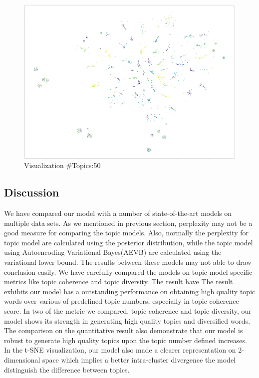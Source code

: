\begin{figure}
\centering
\includegraphics[width=1\linewidth]{figures/0908/tsne_50t_25w_0}
\caption{Visualization \#Topics:50}
\label{fig:tsne50t25w0}
\end{figure}
\subsection{Discussion}
We have compared our model with a number of state-of-the-art models on multiple data sets. 
As we mentioned in previous section, perplexity may not be a good measure for comparing the topic models. Also, normally the perplexity for topic model are calculated using the posterior distribution, while the topic model using Autoencoding Variational Bayes(AEVB) are calculated using the variational lower bound\cite{srivastava_autoencoding_2017}. The results between these models may not able to draw conclusion easily. We have carefully compared the models on topic-model specific metrics like topic coherence and topic diversity. The result have
The result exhibits our model has a outstanding performance on obtaining high quality topic words over various of predefined topic numbers, especially in topic coherence score. In two of the metric we compared, topic coherence and topic diversity, our model shows its strength in generating high quality topics and diversified words. The comparison on the quantitative result also demonstrate that our model is robust to generate high quality topics upon the topic number defined increases.
In the t-SNE visualization, our model also made a clearer representation on 2-dimensional space which implies a better intra-cluster divergence the model distinguish the difference between topics.